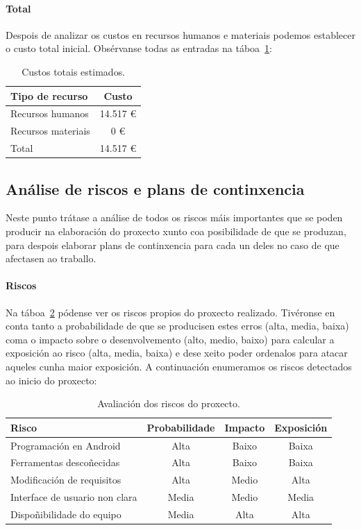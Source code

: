 \paragraph{Total}
Despois de analizar os custos en recursos humanos e materiais podemos establecer o custo total inicial. Obsérvanse todas as entradas na táboa~\ref{tab:custoTotalEstimado}:

\begin{table} [tbh]
	\footnotesize
	\centering
	\begin{tabular}{|l|c|}
		\hline 
		\textbf{Tipo de recurso} & \textbf{Custo} \\ 
		\hline 
		Recursos humanos & 14.517 € \\ 
		\hline 
		Recursos materiais & 0 € \\ 
		\hline 
		Total & 14.517 € \\ 
		\hline 
	\end{tabular}
	\caption{Custos totais estimados.}
	\label{tab:custoTotalEstimado}
\end{table}

\subsection{Análise de riscos e plans de continxencia}
Neste punto trátase a análise de todos os riscos máis importantes que se poden producir na elaboración do proxecto xunto coa posibilidade de que se produzan, para despois elaborar plans de continxencia para cada un deles no caso de que afectasen ao traballo.

\paragraph{Riscos}
Na táboa~\ref{tab:riscos} pódense ver os riscos propios do proxecto realizado. Tivéronse en conta tanto a probabilidade de que se producisen estes erros (alta, media, baixa) coma o impacto sobre o desenvolvemento (alto, medio, baixo) para calcular a exposición ao risco (alta, media, baixa) e dese xeito poder ordenalos para atacar aqueles cunha maior exposición.
A continuación enumeramos os riscos detectados ao inicio do proxecto:

\begin{table} [tbh]
	\footnotesize
	\centering
	\begin{tabular}{|l|c|c|c|}
		\hline 
		\textbf{Risco} & \textbf{Probabilidade} & \textbf{Impacto} & \textbf{Exposición} \\ 
		\hline 
		Programación en Android & Alta & Baixo & Baixa \\ 
		\hline 
		Ferramentas descoñecidas & Alta & Baixo & Baixa \\ 
		\hline 
		Modificación de requisitos & Alta & Medio & Alta \\ 
		\hline 
		Interface de usuario non clara & Media & Medio & Media \\ 
		\hline 
		Dispoñibilidade do equipo & Media & Alta & Alta \\ 
		\hline 
	\end{tabular}
	\caption{Avaliación dos riscos do proxecto.}
	\label{tab:riscos}
\end{table}

